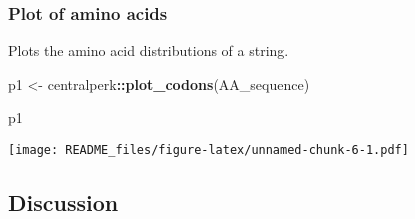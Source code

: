 \documentclass[
]{article}
\newenvironment{Shaded}{\begin{snugshade}}{\end{snugshade}}
\newcommand{\FunctionTok}[1]{\textcolor[rgb]{0.13,0.29,0.53}{\textbf{#1}}}
\newcommand{\NormalTok}[1]{#1}
\newcommand{\OtherTok}[1]{\textcolor[rgb]{0.56,0.35,0.01}{#1}}
\newcommand{\SpecialCharTok}[1]{\textcolor[rgb]{0.81,0.36,0.00}{\textbf{#1}}}
\begin{document}
\subsubsection{Plot of amino acids}\label{plot-of-amino-acids}

Plots the amino acid distributions of a string.

\begin{Shaded}
\begin{Highlighting}[]
\NormalTok{p1 }\OtherTok{\textless{}{-}}\NormalTok{ centralperk}\SpecialCharTok{::}\FunctionTok{plot\_codons}\NormalTok{(AA\_sequence)}

\NormalTok{p1}
\end{Highlighting}
\end{Shaded}

\texttt{[image: README\_files/figure-latex/unnamed-chunk-6-1.pdf]}

\subsection{Discussion}\label{discussion}
\end{document}
